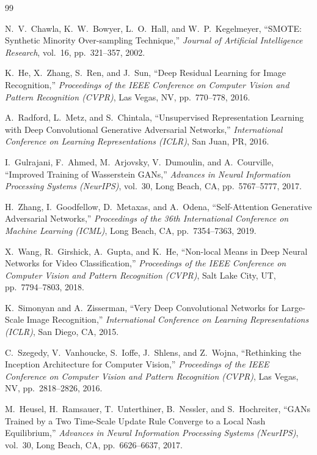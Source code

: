 \documentclass[12pt,letterpaper]{article}
\begin{document}
\newpage
\begin{thebibliography}{99}

N.~V.~Chawla, K.~W.~Bowyer, L.~O.~Hall, and W.~P.~Kegelmeyer,
``SMOTE: Synthetic Minority Over-sampling Technique,''
\textit{Journal of Artificial Intelligence Research}, vol.~16,
pp.~321--357, 2002.

K.~He, X.~Zhang, S.~Ren, and J.~Sun,
``Deep Residual Learning for Image Recognition,''
\textit{Proceedings of the IEEE Conference on Computer Vision and Pattern
Recognition (CVPR)}, Las Vegas, NV, pp.~770--778, 2016.

A.~Radford, L.~Metz, and S.~Chintala,
``Unsupervised Representation Learning with Deep Convolutional Generative
Adversarial Networks,''
\textit{International Conference on Learning Representations (ICLR)},
San Juan, PR, 2016.

I.~Gulrajani, F.~Ahmed, M.~Arjovsky, V.~Dumoulin, and A.~Courville,
``Improved Training of Wasserstein GANs,''
\textit{Advances in Neural Information Processing Systems (NeurIPS)},
vol.~30, Long Beach, CA, pp.~5767--5777, 2017.

H.~Zhang, I.~Goodfellow, D.~Metaxas, and A.~Odena,
``Self-Attention Generative Adversarial Networks,''
\textit{Proceedings of the 36th International Conference on Machine Learning
(ICML)}, Long Beach, CA, pp.~7354--7363, 2019.

X.~Wang, R.~Girshick, A.~Gupta, and K.~He,
``Non-local Means in Deep Neural Networks for Video Classification,''
\textit{Proceedings of the IEEE Conference on Computer Vision and Pattern
Recognition (CVPR)}, Salt Lake City, UT, pp.~7794--7803, 2018.

K.~Simonyan and A.~Zisserman,
``Very Deep Convolutional Networks for Large-Scale Image Recognition,''
\textit{International Conference on Learning Representations (ICLR)},
San Diego, CA, 2015.

C.~Szegedy, V.~Vanhoucke, S.~Ioffe, J.~Shlens, and Z.~Wojna,
``Rethinking the Inception Architecture for Computer Vision,''
\textit{Proceedings of the IEEE Conference on Computer Vision and Pattern
Recognition (CVPR)}, Las Vegas, NV, pp.~2818--2826, 2016.

M.~Heusel, H.~Ramsauer, T.~Unterthiner, B.~Nessler, and S.~Hochreiter,
``GANs Trained by a Two Time-Scale Update Rule Converge to a Local
Nash Equilibrium,''
\textit{Advances in Neural Information Processing Systems (NeurIPS)},
vol.~30, Long Beach, CA, pp.~6626--6637, 2017.


\end{thebibliography}
\end{document}
